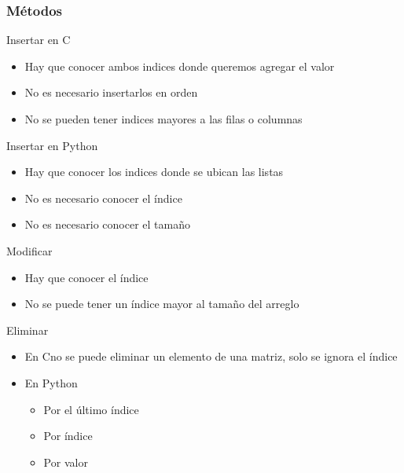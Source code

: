 \documentclass{beamer}
\newcommand{\Rplus}{\protect\hspace{-.1em}\protect\raisebox{.35ex}{\smaller{\smaller\textbf{+}}}}
\newcommand{\Cpp}{\mbox{C\Rplus\Rplus}\hspace{3pt}}
\begin{document}
\subsubsection{M\'etodos}
\begin{frame}{Insertar en \Cpp}
	\begin{itemize}
		\item Hay que conocer ambos indices donde queremos agregar el valor
		\item No es necesario insertarlos en orden
		\item No se pueden tener indices mayores a las filas o columnas
	\end{itemize}
	\centering
\end{frame}

\begin{frame}{Insertar en Python}
	\begin{itemize}
		\item Hay que conocer los indices donde se ubican las listas
		\item No es necesario conocer el \'indice
		\item No es necesario conocer el tamaño 
	\end{itemize}
\end{frame}

\begin{frame}{Modificar}
	\begin{itemize}
		\item Hay que conocer el \'indice
		\item No se puede tener un \'indice mayor al tamaño del arreglo
	\end{itemize}
\end{frame}

\begin{frame}{Eliminar}
	\begin{itemize}
		\item En \Cpp no se puede eliminar un elemento de una matriz, solo se ignora el \'indice 
		\item En Python
		\begin{itemize}
			\item Por el \'ultimo \'indice
			\item Por \'indice
			\item Por valor
		\end{itemize}
	\end{itemize}
\end{frame}
\end{document}
